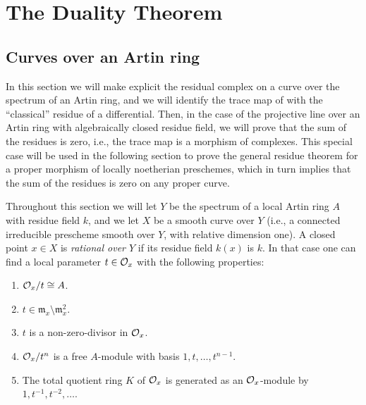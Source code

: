 \chapter{The Duality Theorem}

\section{Curves over an Artin ring}\label{sec:7.1}

In this section we will make explicit the residual complex on a curve over the spectrum of an Artin ring, and we will identify the trace map of  with the ``classical'' residue of a differential. Then, in the case of the projective line over an Artin ring with algebraically closed residue field, we will prove that the sum of the residues is zero, i.e., the trace map is a morphism of complexes. This special case will be used in the following section to prove the general residue theorem for a proper morphism of locally noetherian preschemes, which in turn implies that the sum of the residues is zero on any proper curve.

Throughout this section we will let $Y$ be the spectrum of a local Artin ring $A$ with residue field $k$, and we let $X$ be a smooth curve over $Y$ (i.e., a connected irreducible prescheme smooth over $Y$, with relative dimension one). A closed point $x \in X$ is \emph{rational over $Y$} if its residue field $k(x)$ is $k$. In that case one can find a local parameter $t \in \mathcal{O}_x$ with the following properties:
\begin{enumerate}
\item[(0)] $\mathcal{O}_x/t \cong A$.
\item[(1)] $t \in \mathfrak{m}_x \setminus \mathfrak{m}_x^2$.
\item[(2)] $t$ is a non-zero-divisor in $\mathcal{O}_x$.
\item[(3)] $\mathcal{O}_x/t^n$ is a free $A$-module with basis $1,t,\dots,t^{n-1}$.
\item[(4)] The total quotient ring $K$ of $\mathcal{O}_x$ is generated as an $\mathcal{O}_x$-module by $1,t^{-1},t^{-2},\dots$.
\end{enumerate}

